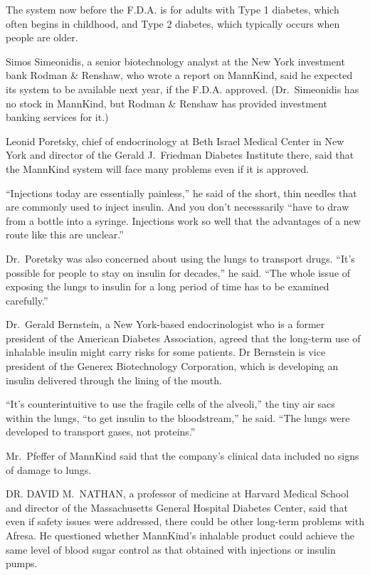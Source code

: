 ﻿\documentclass[12pt]{article}
\begin{document}
The system now before the F.D.A. is for adults with Type 1 diabetes, which often begins in
childhood, and Type 2 diabetes, which typically occurs when people are older.

Simos Simeonidis, a senior biotechnology analyst at the New York investment bank Rodman \& Renshaw,
who wrote a report on MannKind, said he expected its system to be available next year, if the F.D.A.
approved. (Dr.~Simeonidis has no stock in MannKind, but Rodman \& Renshaw has provided investment
banking services for it.)

Leonid Poretsky, chief of endocrinology at Beth Israel Medical Center in New York and director of
the Gerald J.~Friedman Diabetes Institute there, said that the MannKind system will face many
problems even if it is approved.

``Injections today are essentially painless,'' he said of the short, thin needles that are commonly
used to inject insulin. And you don't necesssarily ``have to draw from a bottle into a syringe.
Injections work so well that the advantages of a new route like this are unclear.''

Dr.~Poretsky was also concerned about using the lungs to transport drugs. ``It's possible for people
to stay on insulin for decades,'' he said. ``The whole issue of exposing the lungs to insulin for a
long period of time has to be examined carefully.''

Dr.~Gerald Bernstein, a New York-based endocrinologist who is a former president of the American
Diabetes Association, agreed that the long-term use of inhalable insulin might carry risks for some
patients. Dr Bernstein is vice president of the Generex Biotechnology Corporation, which is
developing an insulin delivered through the lining of the mouth.

``It's counterintuitive to use the fragile cells of the alveoli,'' the tiny air sacs within the
lungs, ``to get insulin to the bloodstream,'' he said. ``The lungs were developed to transport
gases, not proteins.''

Mr.~Pfeffer of MannKind said that the company's clinical data included no signs of damage to lungs.

DR. DAVID M.~NATHAN, a professor of medicine at Harvard Medical School and director of the
Massachusetts General Hospital Diabetes Center, said that even if safety issues were addressed,
there could be other long-term problems with Afresa. He questioned whether MannKind's inhalable
product could achieve the same level of blood sugar control as that obtained with injections or
insulin pumps.
\end{document}
